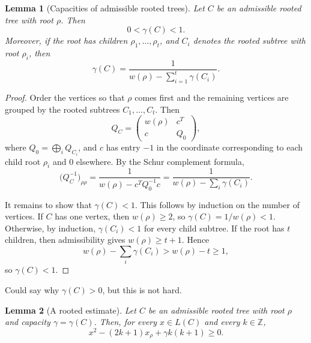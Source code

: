 \documentclass[12pt]{article}
\newtheorem{lemma}{Lemma}
\newcommand{\review}[1]{\begin{reviewbox}#1\end{reviewbox}}
\begin{document}
\begin{lemma}[Capacities of admissible rooted trees]
Let \(C\) be an admissible rooted tree with root \(\rho\). Then
\[
0<\gamma(C)<1.
\]
Moreover, if the root has children \(\rho_1,\dots,\rho_t\), and \(C_i\) denotes the rooted subtree with root \(\rho_i\), then
\[
\gamma(C)=\frac{1}{w(\rho)-\sum_{i=1}^t \gamma(C_i)}.
\]
\end{lemma}

\begin{proof}
Order the vertices so that \(\rho\) comes first and the remaining vertices are grouped by the rooted subtrees \(C_1,\dots,C_t\). Then
\[
Q_C=
\begin{pmatrix}
w(\rho) & c^T\\
c & Q_0
\end{pmatrix},
\]
where \(Q_0=\bigoplus_i Q_{C_i}\), and \(c\) has entry \(-1\) in the coordinate corresponding to each child root \(\rho_i\) and \(0\) elsewhere. By the Schur complement formula,
\[
\bigl(Q_C^{-1}\bigr)_{\rho\rho}
=
\frac{1}{w(\rho)-c^TQ_0^{-1}c}
=
\frac{1}{w(\rho)-\sum_i \gamma(C_i)}.
\]

It remains to show that \(\gamma(C)<1\). This follows by induction on the number of vertices. If \(C\) has one vertex, then \(w(\rho)\ge 2\), so \(\gamma(C)=1/w(\rho)<1\). Otherwise, by induction, \(\gamma(C_i)<1\) for every child subtree. If the root has \(t\) children, then admissibility gives \(w(\rho)\ge t+1\). Hence
\[
w(\rho)-\sum_i \gamma(C_i)>w(\rho)-t\ge 1,
\]
so \(\gamma(C)<1\).
\end{proof}

\review{Could say why $\gamma(C)>0$, but this is not hard.}

\begin{lemma}[A rooted estimate]
Let \(C\) be an admissible rooted tree with root \(\rho\) and capacity \(\gamma=\gamma(C)\). Then, for every \(x\in L(C)\) and every \(k\in \mathbb Z\),
\[
x^2-(2k+1)x_\rho+\gamma k(k+1)\ge 0.
\]
\end{lemma}
\end{document}

